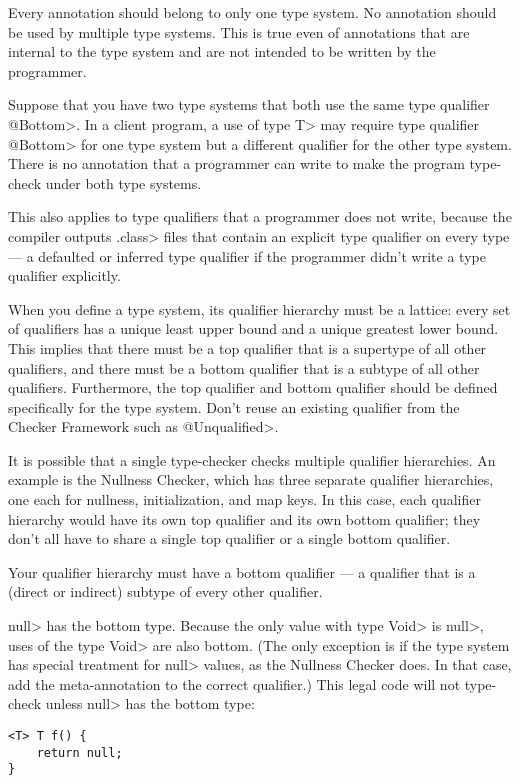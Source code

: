 
Every annotation should belong to only one type system.  No annotation
should be used by multiple type systems.  This is true even of annotations
that are internal to the type system and are not intended to be written by
the programmer.

Suppose that you have two type systems that both use the same type
qualifier \<@Bottom>.  In a client program, a use of type \<T> may require type
qualifier \<@Bottom> for one type system but a different qualifier for the other
type system.  There is no annotation that a programmer can write to make
the program type-check under both type systems.

This also applies to type qualifiers that a programmer does not write,
because the compiler outputs \<.class> files that contain an explicit type
qualifier on every type --- a defaulted or inferred type qualifier if the
programmer didn't write a type qualifier explicitly.



When you define a type system, its qualifier hierarchy must be a
lattice:  every set of qualifiers has a unique least upper bound and a unique
greatest lower bound.  This implies that there must be a top qualifier that is a
supertype of all other qualifiers, and there must be a bottom qualifier that is a
subtype of all other qualifiers.
Furthermore, the top qualifier and bottom qualifier should be defined
specifically for the type system.  Don't reuse an existing qualifier from the
Checker Framework such as \<@Unqualified>.

It is possible that a single type-checker checks multiple qualifier hierarchies.
An example is the Nullness Checker, which has three separate qualifier
hierarchies, one each for
nullness, initialization, and map keys.  In this case, each qualifier hierarchy
would have its own top qualifier and its own bottom qualifier; they don't
all have to share a single top qualifier or a single bottom qualifier.


Your qualifier hierarchy must have a bottom qualifier
--- a qualifier that is a (direct or indirect) subtype of every other
qualifier.

\<null> has the bottom type. Because the only value with type \<Void> is
\<null>, uses of the type \<Void> are also bottom.
(The only exception
is if the type system has special treatment for \<null> values, as the
Nullness Checker does. In that case, add the meta-annotation
to the correct qualifier.)
This legal code
will not type-check unless \<null> has the bottom type:
\begin{Verbatim}
<T> T f() {
    return null;
}
\end{Verbatim}


